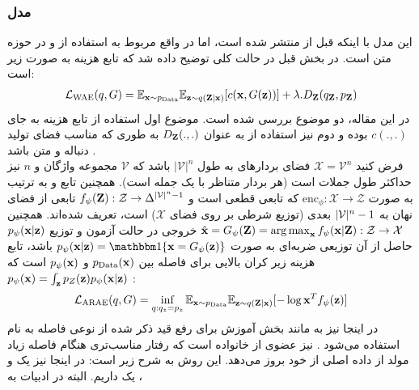 \subsubsection{مدل
	} \label{chap2:arae}
این مدل با اینکه قبل از \wae{} منتشر شده است، اما در واقع مربوط به استفاده از \wgan{} و \wae{} در حوزه متن است. در بخش قبل در حالت کلی توضیح داده شد که تابع هزینه \wae{} به صورت زیر است:
\begin{align}
	\mathcal{L}_{\text{WAE}}(q, G) = \mathbb E_{{\bf x} \sim p_{\text{Data}}}\mathbb E_{{\bf z} \sim q({\bf Z}|{\bf x})} [c({\bf x}, G({\bf z}))] + \lambda . D_ {\bf Z}(q_{\bf Z}, p_{\bf Z})
\end{align}
در این مقاله، دو موضوع بررسی شده است. موضوع اول استفاده از تابع هزینه \crossentropy{} به جای $c(.,.)$ بوده و دوم نیز استفاده از \wgan{} به عنوان $D_{\bf Z}(.,.)$ به طوری که مناسب فضای تولید دنباله و متن باشد \cite{wae_text_reg}.
\\
فرض کنید $\mathcal{X} = \mathcal{V}^n$ فضای بردارهای
به طول $|\mathcal{V}|^n$ باشد که $\mathcal{V}$ مجموعه واژگان و $n$ نیز حداکثر طول جملات است (هر بردار متناظر با یک جمله است). همچنین تابع \encoder{} و \decoder{} به ترتیب به صورت
$\text{enc}_\phi: \mathcal{X} \rightarrow \mathcal{Z}$
که تابعی قطعی است و $f_\psi({\bf Z}) : {\mathcal{Z}} \rightarrow \Delta^{|{\mathcal{V}}|^n - 1}$ تابعی از فضای نهان به
 $|{\mathcal{V}}|^n - 1$
بعدی (توزیع شرطی بر روی فضای $\mathcal{X}$) است، تعریف شده‌اند. همچنین
$\hat{{\bf x}} = G_\psi({\bf Z})  = \operatorname*{arg\,max}_{
		{\bf x}} f_\psi({\bf x}|{\bf Z}) : {\mathcal{Z}} \rightarrow {\mathcal{X}}$
خروجی \decoder{} در حالت آزمون و توزیع $p_\psi({\bf x}|{\bf z})$ حاصل از آن توزیعی ضربه‌ای به صورت
$p_\psi(\bff{x}|\bff{z}) = \bbm{1}\{\bff{x} = G_\psi(\bff{z})\}$
باشد، تابع هزینه زیر کران بالایی برای فاصله \wasser{} بین $p_\text{Data}({\bf x})$ و $p_\psi({\bf x})$ است که
$p_\psi({\bf x}) = \int_{\bf z} p_Z({\bf z})p_\psi({\bf x}|{\bf z})$
:
\begin{align}
	\mathcal{L}_{\text{ARAE}}(q, G) = \inf_{q: q_z = p_z} \mathbb E_{{\bf x} \sim p_{\text{Data}}}\mathbb E_{{\bf z} \sim q({\bf Z}|{\bf x})} [-\log {\bf x}^T f_\psi({\bf z})]
\end{align}
در اینجا نیز به مانند بخش آموزش  \wae{} برای رفع قید ذکر شده از نوعی فاصله به نام \wgan{} استفاده می‌شود \cite{wae_text_reg}.
 \wgan{} نیز عضوی از خانواده \gan{} است که رفتار مناسب‌تری هنگام فاصله زیاد مولد از داده اصلی از خود بروز می‌دهد. این روش به شرح زیر است:
در اینجا نیز یک \generator{} و یک \discriminator{} داریم. البته در ادبیات \wgan{} به \discriminator{}،
